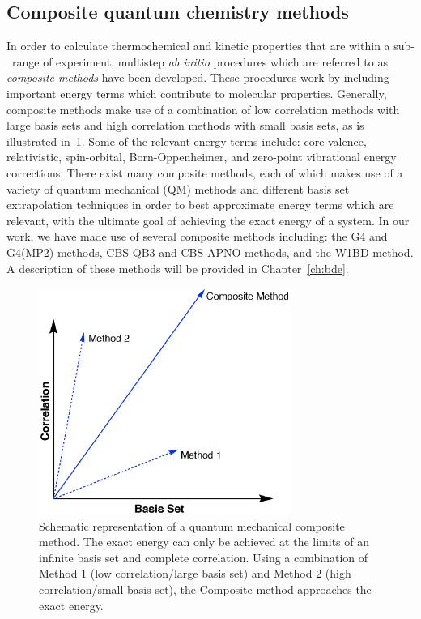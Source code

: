 \subsection{Composite quantum chemistry methods}

In order to calculate thermochemical and kinetic properties that are within a
sub-\kcalmol\ range of experiment, multistep \emph{ab initio} procedures which
are referred to as \emph{composite methods} have been
developed.\cite{Karton2016} These procedures work by including important energy
terms which contribute to molecular properties. Generally, composite methods
make use of a combination of low correlation methods with large basis sets and
high correlation methods with small basis sets, as is illustrated
in~\ref{fig:comp}. Some of the relevant energy terms include: core-valence,
relativistic, spin-orbital, Born-Oppenheimer, and zero-point vibrational energy
corrections. There exist many composite methods, each of which makes use of a
variety of quantum mechanical (QM) methods and different basis set
extrapolation techniques in order to best approximate energy terms which are
relevant, with the ultimate goal of achieving the exact energy of a system. In
our work, we have made use of several composite methods including: the G4 and
G4(MP2) methods,\cite{Curtiss2007,Curtiss2007a} CBS-QB3 and CBS-APNO
methods,\cite{Montgomery1999,Montgomery2000,Ochterski1996} and the W1BD
method.\cite{Barnes2009} A description of these methods will be provided in
Chapter~\ref{ch:bde}.

\begin{figure}[htb]
  \centering
  \includegraphics[height=20em]{figures/compositemethods.eps}
  \caption[Schematic representation of a quantum mechanical composite
  method.]{Schematic representation of a quantum mechanical composite method.
  The exact energy can only be achieved at the limits of an infinite basis set
  and complete correlation. Using a combination of Method 1 (low
  correlation/large basis set) and Method 2 (high correlation/small basis set),
  the Composite method approaches the exact energy.} \label{fig:comp}
\end{figure}

